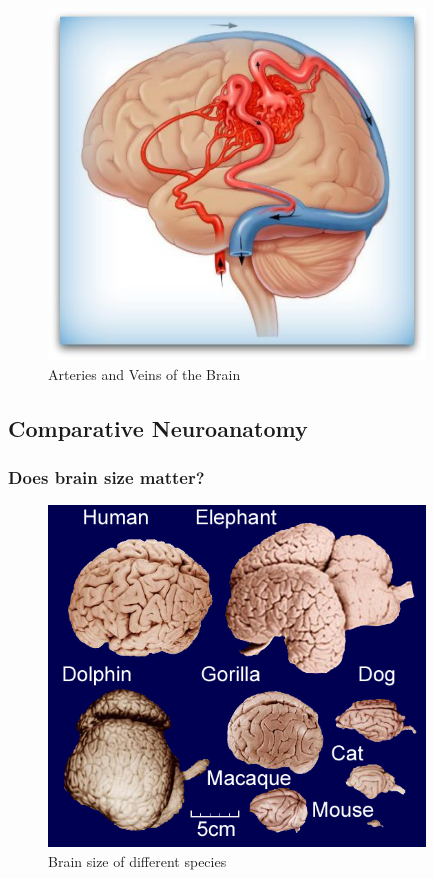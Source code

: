 \documentclass[12pt,article,oneside,a4paper]{memoir}
\begin{document}
\begin{figure}
	\centering
  	\includegraphics[width=10cm]{imgs/avm_large.jpg}
	\caption{Arteries and Veins of the Brain}
  	\label{fig:arteriesVeinsBrain}
\end{figure}

\subsection{Comparative Neuroanatomy}

\subsubsection{Does brain size matter?}
\begin{figure}
	\centering
  	\includegraphics[width=10cm]{imgs/comparativeBrainSize.jpg}
	\caption{Brain size of different species}
  	\label{fig:comparativeBrainSizes}
\end{figure}
\end{document}

